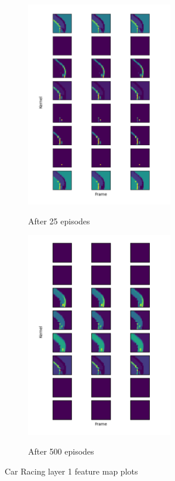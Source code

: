 \begin{figure}[H]
  \captionsetup[subfigure]{justification=centering}
  \centering
  \begin{subfigure}{0.44\linewidth}
    {\includegraphics[height=9cm]{figures/images/car_racing_frames_25.png}}
    \caption{After 25 episodes}
  \end{subfigure}
  \hfill
  \begin{subfigure}{0.44\linewidth}
    {\includegraphics[height=9cm]{figures/images/car_racing_frames_500.png}}
    \caption{After 500 episodes}
  \end{subfigure}
  \caption[Car Racing feature map plots]{Car Racing layer 1 feature map plots}
  \label{fig:car_racing_frame_viz}
\end{figure}
